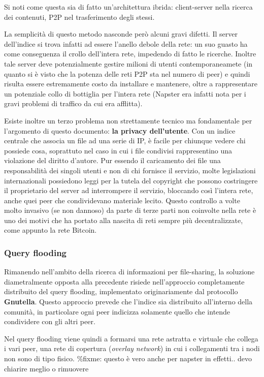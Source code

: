 Si noti come questa sia di fatto un'architettura ibrida: client-server
nella ricerca dei contenuti, P2P nel trasferimento degli stessi.

La semplicità di questo metodo nasconde però alcuni gravi difetti. Il
server dell'indice si trova infatti ad essere l'anello debole della
rete: un suo guasto ha come conseguenza il crollo dell'intera rete,
impedendo di fatto le ricerche. Inoltre tale server deve potenzialmente
gestire milioni di utenti contemporaneamete (in quanto si è visto che la
potenza delle reti P2P sta nel numero di peer) e quindi risulta essere
estremamente costo da installare e mantenere, oltre a rappresentare un
potenziale collo di bottiglia per l'intera rete (Napster era infatti
nota per i gravi problemi di traffico da cui era afflitta).

Esiste inoltre un terzo problema non strettamente tecnico ma
fondamentale per l'argomento di questo documento: \textbf{la privacy
dell'utente}. Con un indice centrale che associa un file ad una serie di
IP, è facile per chiunque vedere chi possiede cosa, soprattuto nel caso
in cui i file condivisi rappresentino una violazione del diritto
d'autore. Pur essendo il caricamento dei file una responsabilità dei
singoli utenti e non di chi fornisce il servizio, molte legislazioni
internazionali possiedono leggi per la tutela del copyright che possono
costringere il proprietario del server ad interrompere il servizio,
bloccando così l'intera rete, anche quei peer che condividevano
materiale lecito. Questo controllo a volte molto invasivo (se non
dannoso) da parte di terze parti non coinvolte nella rete è uno dei
motivi che ha portato alla nascita di reti sempre più decentralizzate,
come appunto la rete Bitcoin.

\subsubsection{Query flooding}\label{query-flooding}

Rimanendo nell'ambito della ricerca di informazioni per file-sharing, la
soluzione diametralmente opposta alla precedente risiede nell'approccio
completamente distribuito del query flooding, implementato
originariamente dal protocollo \textbf{Gnutella}. Questo approccio
prevede che l'indice sia distribuito all'interno della comunità, in
particolare ogni peer indicizza solamente quello che intende condividere
con gli altri peer.

Nel query flooding viene quindi a formarsi una rete astratta e virtuale
che collega i vari peer, una rete di copertura (\emph{overlay network})
in cui i collegamenti tra i nodi non sono di tipo fisico. \%fixme:
questo è vero anche per napster in effetti.. devo chiarire meglio o
rimuovere

